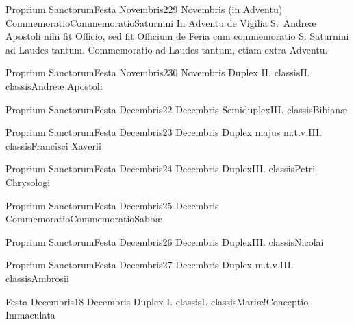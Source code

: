 \documentclass[liber-responsorialis-hiemalis.tex]{subfiles}
\begin{document}

	{Proprium Sanctorum}{Festa Novembris}{2}{29 Novembris (in Adventu)}
	{Commemoratio}{Commemoratio}{Saturnini}
	{In Adventu de Vigilia S.\ Andreæ Apostoli nihi fit Officio, sed fit Officium de Feria cum commemoratio S. Saturnini ad Laudes tantum.}
	{Commemoratio ad Laudes tantum, etiam extra Adventu.}
\rubric{\respdetemp}

	{Proprium Sanctorum}{Festa Novembris}{2}{30 Novembris}
	{Duplex II. classis}{II. classis}{Andreæ Apostoli}
	{}
	{}


	{Proprium Sanctorum}{Festa Decembris}{2}{2 Decembris}
	{Semiduplex}{III. classis}{Bibianæ}
	{\vmrubric}
	{\respdetemp}

	{Proprium Sanctorum}{Festa Decembris}{2}{3 Decembris}
	{Duplex majus m.t.v.}{III. classis}{Francisci Xaverii}
	{\conprubric}
	{\respdetemp}

	{Proprium Sanctorum}{Festa Decembris}{2}{4 Decembris}
	{Duplex}{III. classis}{Petri Chrysologi}
	{\copodorubric}
	{\respdetemp}

	{Proprium Sanctorum}{Festa Decembris}{2}{5 Decembris}
	{Commemoratio}{Commemoratio}{Sabbæ}
	{}
	{}
\rubric{\respdetemp}

	{Proprium Sanctorum}{Festa Decembris}{2}{6 Decembris}
	{Duplex}{III. classis}{Nicolai}
	{\coporubric}
	{\respdetemp}

	{Proprium Sanctorum}{Festa Decembris}{2}{7 Decembris}
	{Duplex m.t.v.}{III. classis}{Ambrosii}
	{\copodorubric}
	{\respdetemp}

	{Festa Decembris}{1}{8 Decembris}
	{Duplex I. classis}{I. classis}{Mariæ!Conceptio Immaculata}
	{}
	{}
\end{document}
